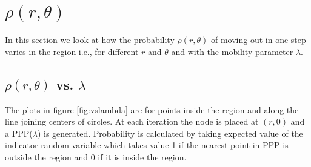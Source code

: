 \section{$\rho(r,\theta)$}
In this section we look at how the probability $\rho(r,\theta)$ of moving out in one step varies in the region i.e., for different $r$ and $\theta$ and with the mobility parameter $\lambda$. 

\subsection{$\rho(r,\theta)$ vs. $\lambda$}

The plots in figure \ref{fig:vslambda} are for points inside the region and along the line joining centers of circles. At each iteration the node is placed at $(r,0)$ and a PPP($\lambda$) is generated. Probability is calculated by taking expected value of the indicator random variable which takes value 1 if the nearest point in PPP is outside the region and 0 if it is inside the region. 
